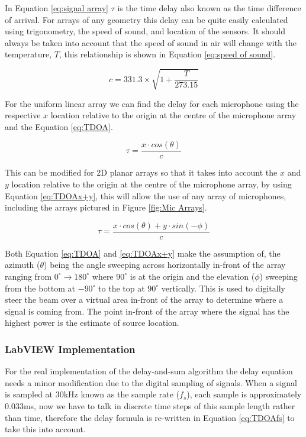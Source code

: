\documentclass{UoNMCHA}
\numberwithin{equation}{section}
\begin{document}
    In Equation \ref{eq:signal array} $\tau$ is the time delay also known as the time difference of arrival. For arrays of any geometry this delay can be quite easily calculated using trigonometry, the speed of sound, and location of the sensors. It should always be taken into account that the speed of sound in air will change with the temperature, $T$, this relationship is shown in Equation \ref{eq:speed of sound}. 
    
    \begin{equation}
        c = 331.3 \times \sqrt{1+\frac{T}{273.15}}
        \label{eq:speed of sound}
    \end{equation}
    
    For the uniform linear array we can find the delay for each microphone using the respective $x$ location relative to the origin at the centre of the microphone array and the Equation \ref{eq:TDOA}.
    
    \begin{equation}
        \tau = \frac{x\cdot cos(\theta)}{c}
        \label{eq:TDOA}
    \end{equation}
    
    This can be modified for 2D planar arrays so that it takes into account the $x$ and $y$ location  relative to the origin at the centre of the microphone array, by using Equation \ref{eq:TDOAx+y}, this will allow the use of any array of microphones, including the arrays pictured in Figure \ref{fig:Mic Arrays}.
    
    \begin{equation}
        \tau = \frac{x \cdot cos(\theta) + y \cdot sin(-\phi)}{c}
        \label{eq:TDOAx+y}
    \end{equation}
    
    Both Equation \ref{eq:TDOA} and \ref{eq:TDOAx+y} make the assumption of, the azimuth ($\theta$) being the angle sweeping across horizontally in-front of the array ranging from $0^{\circ} \to 180^{\circ}$ where $90^{\circ}$ is at the origin and the elevation ($\phi$) sweeping from the bottom at $-90^{\circ}$ to the top at $90^{\circ}$ vertically. This is used to digitally steer the beam over a virtual area in-front of the array to determine where a signal is coming from. The point in-front of the array where the signal has the highest power is the estimate of source location.
\subsubsection{LabVIEW Implementation} \label{sec:DAS Implementation}
    For the real implementation of the delay-and-sum algorithm the delay equation needs a minor modification due to the digital sampling of signals. When a signal is sampled at $30$kHz known as the sample rate ($f_s$), each sample is approximately $0.033$ms, now we have to talk in discrete time steps of this sample length rather than time, therefore the delay formula is re-written in Equation \ref{eq:TDOAfs} to take this into account.
    
\end{document}
